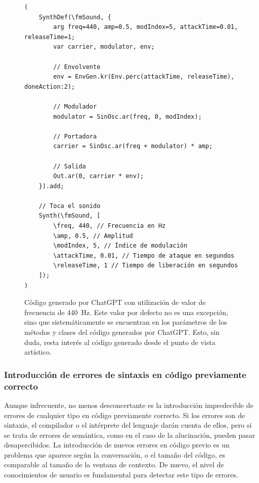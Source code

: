 \begin{figure}[H]
    \caption[Código generado por ChatGPT con utilización de valor de frecuencia de \SI{440}{\hertz}]{Código generado por ChatGPT con utilización de valor de frecuencia de \SI{440}{\hertz}. Este valor por defecto no es una excepción, sino que sistemáticamente se encuentran en los parámetros de los métodos y clases del código generados por ChatGPT. Esto, sin duda, resta interés al código generado desde el punto de vista artístico.}
    \centering
    \begin{lstlisting}[style=SuperCollider-IDE, basicstyle=\footnotesize\ttfamily, numbers=none]
(
    SynthDef(\fmSound, {
        arg freq=440, amp=0.5, modIndex=5, attackTime=0.01, releaseTime=1;
        var carrier, modulator, env;
    
        // Envolvente
        env = EnvGen.kr(Env.perc(attackTime, releaseTime), doneAction:2);
    
        // Modulador
        modulator = SinOsc.ar(freq, 0, modIndex);
    
        // Portadora
        carrier = SinOsc.ar(freq + modulator) * amp;
    
        // Salida
        Out.ar(0, carrier * env);
    }).add;
    
    // Toca el sonido
    Synth(\fmSound, [
        \freq, 440, // Frecuencia en Hz
        \amp, 0.5, // Amplitud
        \modIndex, 5, // Índice de modulación
        \attackTime, 0.01, // Tiempo de ataque en segundos
        \releaseTime, 1 // Tiempo de liberación en segundos
    ]);
) 
    \end{lstlisting}
    \source{\propio}
    \label{fig:ChatGPT_valores_por_defecto}
\end{figure}



\subsubsection{Introducción de errores de sintaxis en código previamente correcto}
Aunque infrecuente, no menos desconcertante es la introducción impredecible de errores de cualquier tipo en código previamente correcto. Si los errores son de sintaxis, el compilador o el intérprete del lenguaje darán cuenta de ellos, pero si se trata de errores de semántica, como en el caso de la alucinación, pueden pasar desapercibidos. La introducción de nuevos errores en código previo es un problema que aparece según la conversación, o el tamaño del código, es comparable al tamaño de la ventana de contexto. De nuevo, el nivel de conocimientos de usuario es fundamental para detectar este tipo de errores.


